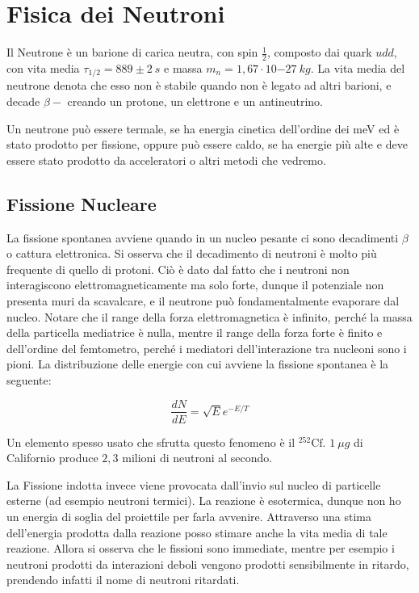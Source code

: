 
\chapter{Fisica dei Neutroni}

Il Neutrone è un barione di carica neutra, con spin $\frac{1}{2}$, composto dai quark $udd$, con vita media $\tau_{1/2}=889\pm 2 \ s$ e massa $m_n=1,67\cdot 10{-27} \ kg$. 
La vita media del neutrone denota che esso non è stabile quando non è legato ad altri barioni, e decade $\beta - $ creando un protone, un elettrone e un antineutrino.

Un neutrone può essere termale, se ha energia cinetica dell'ordine dei meV ed è stato prodotto per fissione, oppure può essere caldo, se ha energie più alte e deve essere stato prodotto da acceleratori o altri metodi che vedremo.

\section{Fissione Nucleare}

La fissione spontanea avviene quando in un nucleo pesante ci sono decadimenti $\beta$ o cattura elettronica. Si osserva che il decadimento di neutroni è molto più frequente di quello di protoni. Ciò è dato dal fatto che i neutroni non interagiscono elettromagneticamente ma solo forte, dunque il potenziale non presenta muri da scavalcare, e il neutrone può fondamentalmente evaporare dal nucleo. 
Notare che  il range della forza elettromagnetica è infinito, perché la massa della particella mediatrice è nulla, mentre il range della forza forte è finito e dell'ordine del femtometro, perché i mediatori dell'interazione tra nucleoni sono i pioni. La distribuzione delle energie con cui avviene la fissione spontanea è la seguente:

\begin{equation}
\frac{dN}{dE}=\sqrt{E}e^{-E/T}
\end{equation}

Un elemento spesso usato che sfrutta questo fenomeno è il $^{252}\text{Cf}$. $1 \ \mu g$ di Californio produce $2,3$ milioni di neutroni al secondo.

La Fissione indotta invece viene provocata dall'invio sul nucleo di particelle esterne (ad esempio neutroni termici). La reazione è esotermica, dunque non ho un energia di soglia del proiettile per farla avvenire. Attraverso una stima dell'energia prodotta dalla reazione posso stimare anche la vita media di tale reazione. Allora si osserva che le fissioni sono immediate, mentre per esempio i neutroni prodotti da interazioni deboli vengono prodotti sensibilmente in ritardo, prendendo infatti il nome di neutroni ritardati.

